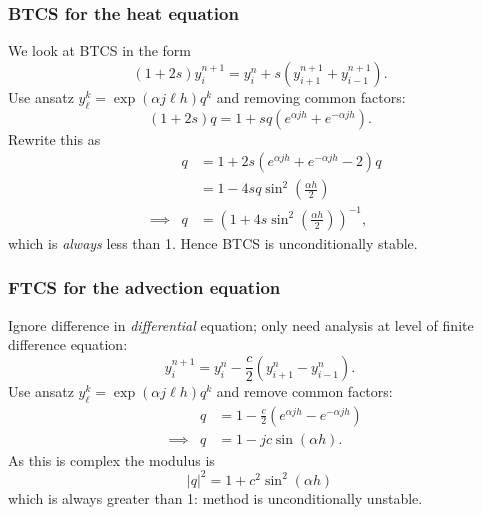 \documentclass{beamer}
\begin{document}
\begin{frame}
  \frametitle{BTCS for the heat equation}
  
  We look at BTCS in the form
  \begin{equation*}
    (1 + 2 s) y_i^{n+1} = y_i^n + s \left( y_{i+1}^{n+1} +
      y_{i-1}^{n+1} \right). 
  \end{equation*} \pause
  Use ansatz $y_{\ell}^k =  \exp (\alpha j \ell h) q^k$
  and removing common factors:
  \begin{equation*}
    (1 + 2 s) q = 1 + s q \left( e^{\alpha j h} +  e^{-\alpha j h}
    \right). 
  \end{equation*} \pause
  Rewrite this as
  \begin{align*}
    && q & = 1 + 2 s \left( e^{\alpha j h} +  e^{-\alpha j h} - 2 \right)
    q \\
    && & = 1 - 4 s q \sin^2 \left( \tfrac{\alpha h}{2} \right) \\
    & \implies & q & = \left( 1 + 4 s \sin^2 \left( \tfrac{\alpha
          h}{2} \right) \right)^{-1}, 
  \end{align*} \pause
  which is \emph{always} less than 1. Hence BTCS is unconditionally
  stable. 
  
\end{frame}

\begin{frame}
  \frametitle{FTCS for the advection equation}

  Ignore difference in \emph{differential} equation; only need
  analysis at level of finite difference equation:
  \begin{equation*}
    y_i^{n+1} = y_i^n - \frac{c}{2} \left( y_{i+1}^n - y_{i-1}^n
    \right).
  \end{equation*}
  Use ansatz $y_{\ell}^k = \exp (\alpha j \ell h) q^k$ and remove
  common factors:
  \begin{align*}
    && q & = 1 - \frac{c}{2} \left( e^{\alpha j h} - e^{-\alpha j h}
    \right) \\
    & \implies & q & = 1 - j c \sin ( \alpha h ).
  \end{align*} \pause
  As this is complex the modulus is
  \begin{equation*}
    |q|^2 = 1 + c^2 \sin^2 ( \alpha h )
  \end{equation*}
  which is always greater than 1: method is unconditionally unstable.

\end{frame}
\end{document}

